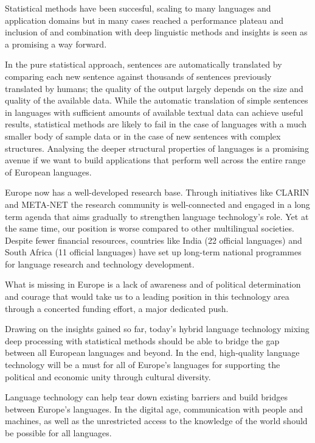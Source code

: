 \documentclass[10pt, plain]{../../metanetpaper}
\begin{document}
\begin{multicols}{2}
Statistical methods have been succesful, scaling to many languages and application domains but in many cases reached a performance plateau and inclusion of and combination with deep linguistic methods and insights is seen as a promising a way forward.

In the pure statistical approach, sentences are automatically translated by comparing each new sentence against thousands of sentences previously translated by humans; the quality of the output largely depends on the size and quality of the available data. While the automatic translation of simple sentences in languages with sufficient amounts of available textual data can achieve useful results, statistical methods are likely to fail in the case of languages with a much smaller body of sample data or in the case of new sentences with complex structures. Analysing the deeper structural properties of languages is a promising avenue if we want to build applications that perform well across the entire range of European languages.

Europe now has a well-developed research base. Through initiatives like CLARIN and META-NET the research community is well-connected and engaged in a long term agenda that aims gradually to strengthen language technology's role. Yet at the same time, our position is worse compared to other multilingual societies. Despite fewer financial resources, countries like India (22 official languages) and South Africa (11 official languages) have set up long-term national programmes for language research and technology development.

What is missing in Europe is a lack of awareness and of political determination and courage that would take us to a leading position in this technology area through a concerted funding effort, a major dedicated push.

Drawing on the insights gained so far, today’s hybrid language technology mixing deep processing with statistical methods should be able to bridge the gap between all European languages and beyond. In the end, high-quality language technology will be a must for all of Europe's languages for supporting the political and economic unity through cultural diversity.

Language technology can help tear down existing barriers and build bridges between Europe’s languages. In the digital age, communication with people and machines, as well as the unrestricted access to the knowledge of the world should be possible for all languages.


\end{multicols}
\end{document}
